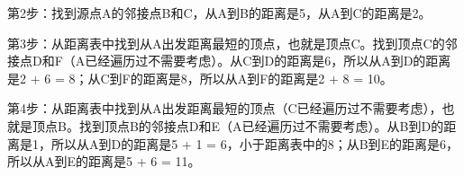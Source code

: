 第2步：找到源点A的邻接点B和C，从A到B的距离是5，从A到C的距离是2。

\begin{table}[H]
    \centering
\end{table}

第3步：从距离表中找到从A出发距离最短的顶点，也就是顶点C。找到顶点C的邻接点D和F（A已经遍历过不需要考虑）。从C到D的距离是6，所以从A到D的距离是2 + 6 = 8；从C到F的距离是8，所以从A到F的距离是2 + 8 = 10。

\begin{table}[H]
    \centering
\end{table}

第4步：从距离表中找到从A出发距离最短的顶点（C已经遍历过不需要考虑），也就是顶点B。找到顶点B的邻接点D和E（A已经遍历过不需要考虑）。从B到D的距离是1，所以从A到D的距离是5 + 1 = 6，小于距离表中的8；从B到E的距离是6，所以从A到E的距离是5 + 6 = 11。

\begin{table}[H]
    \centering
\end{table}

